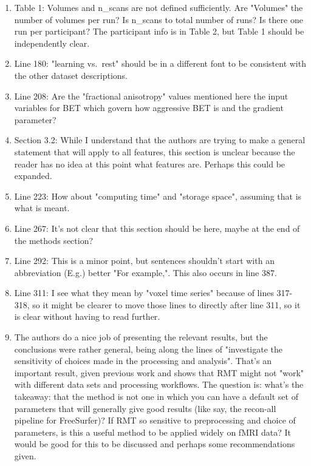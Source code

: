\documentclass[10pt,letter]{article}
\begin{document}
\begin{enumerate}
\item Table 1: Volumes and n\_scans are not defined sufficiently. Are "Volumes"
the number of volumes per run? Is n\_scans to total number of runs? Is there
one run per participant? The participant info is in Table 2, but Table 1 should
be independently clear.

\item Line 180: "learning vs.\ rest" should be in a different font to be
consistent with the other dataset descriptions.

\item Line 208: Are the "fractional anisotropy" values mentioned here the input
variables for BET which govern how aggressive BET is and the gradient
parameter?

\item Section 3.2: While I understand that the authors are trying to make a
general statement that will apply to all features, this section is unclear
because the reader has no idea at this point what features are. Perhaps this
could be expanded.

\item Line 223: How about "computing time" and "storage space", assuming that is
what is meant.

\item Line 267: It's not clear that this section should be here, maybe at the end
of the methods section?

\item Line 292: This is a minor point, but sentences shouldn't start with an
abbreviation (E.g.) better "For example,". This also occurs in line 387.

\item Line 311: I see what they mean by "voxel time series" because of lines
317-318, so it might be clearer to move those lines to directly after line 311,
so it is clear without having to read further.

\item The authors do a nice job of presenting the relevant results, but the
conclusions were rather general, being along the lines of "investigate the
sensitivity of choices made in the processing and analysis". That's an
important result, given previous work and shows that RMT might not "work" with
different data sets and processing workflows. The question is: what's the
takeaway: that the method is not one in which you can have a default set of
parameters that will generally give good results (like say, the recon-all
pipeline for FreeSurfer)? If RMT so sensitive to preprocessing and choice of
parameters, is this a useful method to be applied widely on fMRI data? It would
be good for this to be discussed and perhaps some recommendations given.
\end{enumerate}
\end{document}
